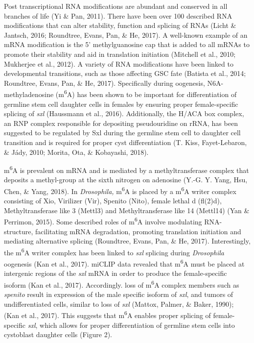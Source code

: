 \documentclass[12pt,oneside]{reedthesis}
\begin{document}
Post transcriptional RNA modifications are abundant and conserved in all
branches of life (Yi \& Pan, 2011). There have been over 100 described RNA
modifications that can alter stability, function and splicing of RNAs
(Licht \& Jantsch, 2016; Roundtree, Evans, Pan, \& He, 2017). A well-known example of an mRNA
modification is the 5' methylguanosine cap that is added to all mRNAs to
promote their stability and aid in translation initiation
(Mitchell et al., 2010; Mukherjee et al., 2012). A variety of RNA modifications have
been linked to developmental transitions, such as those affecting GSC
fate (Batista et al., 2014; Roundtree, Evans, Pan, \& He, 2017). Specifically during oogenesis,
N6A-methyladenosine (m\textsuperscript{6}A) has been shown to be important for
differentiation of germline stem cell daughter cells in females by
ensuring proper female-specific splicing of \emph{sxl} (Haussmann et al., 2016).
Additionally, the H/ACA box complex, an RNP complex responsible for
depositing pseudouridine on rRNA, has been suggested to be regulated by
Sxl during the germline stem cell to daughter cell transition and is
required for proper cyst differentiation (T. Kiss, Fayet-Lebaron, \& Jády, 2010; Morita, Ota, \& Kobayashi, 2018).

m\textsuperscript{6}A is prevalent on mRNA and is mediated by a methyltransferase
complex that deposits a methyl-group at the sixth nitrogen on adenosine
(Y.-G. Y. Yang, Hsu, Chen, \& Yang, 2018). In \emph{Drosophila,} m\textsuperscript{6}A is placed by a m\textsuperscript{6}A writer
complex consisting of Xio, Virilizer (Vir), Spenito (Nito), female
lethal d (fl(2)d), Methyltransferase like 3 (Mettl3) and
Methyltransferase like 14 (Mettl14) (Yan \& Perrimon, 2015). Some described roles
of m\textsuperscript{6}A involve modulating RNA-structure, facilitating mRNA
degradation, promoting translation initiation and mediating alternative
splicing (Roundtree, Evans, Pan, \& He, 2017). Interestingly, the m\textsuperscript{6}A writer complex
has been linked to \emph{sxl} splicing during \emph{Drosophila} oogenesis
(Kan et al., 2017). miCLIP data revealed that m\textsuperscript{6}A must be placed at
intergenic regions of the \emph{sxl} mRNA in order to produce the
female-specific isoform (Kan et al., 2017). Accordingly. loss of m\textsuperscript{6}A
complex members such as \emph{spenito} result in expression of the male
specific isoform of \emph{sxl}, and tumors of undifferentiated cells, similar
to loss of \emph{sxl} (Mattox, Palmer, \& Baker, 1990); (Kan et al., 2017). This suggests that
m\textsuperscript{6}A enables proper splicing of female-specific \emph{sxl}, which allows for
proper differentiation of germline stem cells into cystoblast daughter
cells (Figure 2).
\end{document}
